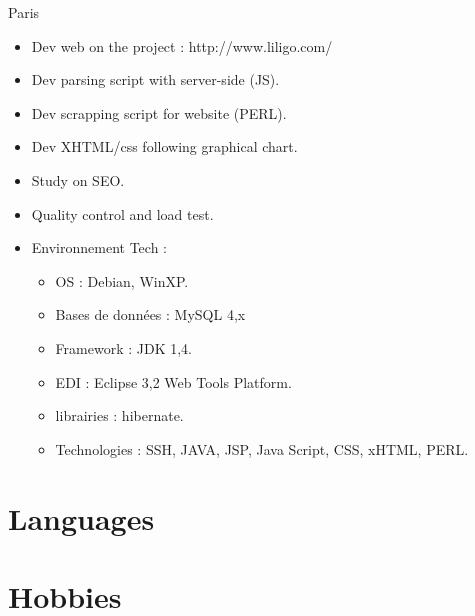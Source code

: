 \documentclass[10pt,a4paper,sans]{moderncv}
\begin{document}
{Paris}{
  \begin{itemize}%
    \item Dev web on the project : http://www.liligo.com/
    \item Dev parsing script with server-side (JS).
    \item Dev scrapping script for website (PERL).
    \item Dev XHTML/css following graphical chart.
    \item Study on SEO.
    \item Quality control and load test.
    \item Environnement Tech :
      \begin{itemize}%
        \item OS : Debian, WinXP.
        \item Bases de données : MySQL 4,x
        \item Framework : JDK 1,4.
        \item EDI : Eclipse 3,2 Web Tools Platform.
        \item librairies : hibernate.
        \item Technologies : SSH, JAVA, JSP, Java Script, CSS, xHTML, PERL.
      \end{itemize}
  \end{itemize}}


\section{Languages}

\section{Hobbies}

\clearpage
\end{document}
